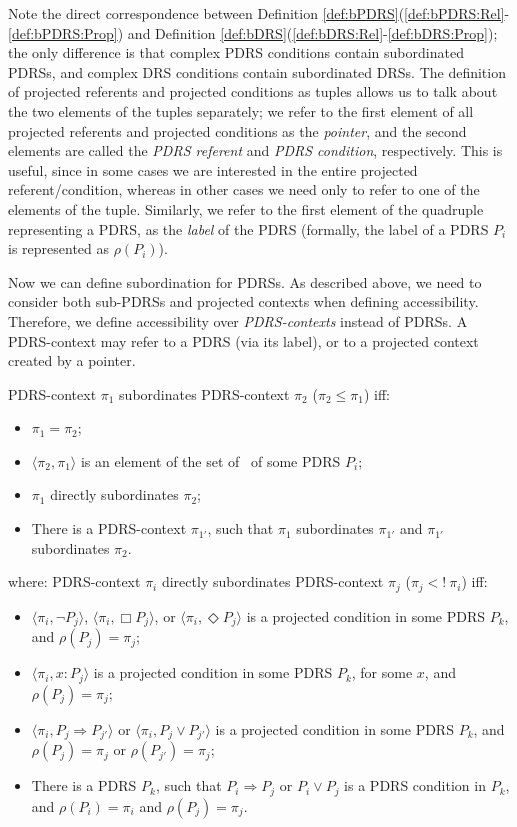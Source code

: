 \noindent Note the direct correspondence between Definition
\ref{def:bPDRS}(\ref{def:bPDRS:Rel}-\ref{def:bPDRS:Prop}) and Definition
\ref{def:bDRS}(\ref{def:bDRS:Rel}-\ref{def:bDRS:Prop}); the only difference
is that complex PDRS conditions contain subordinated PDRSs, and complex DRS
conditions contain subordinated DRSs.  The definition of projected referents
and projected conditions as tuples allows us to talk about the two elements
of the tuples separately; we refer to the first element of all projected
referents and projected conditions as the \textit{pointer}, and the second
elements are called the \textit{PDRS referent} and \textit{PDRS condition},
respectively. This is useful, since in some cases we are interested in the
entire projected referent/condition, whereas in other cases we need only to
refer to one of the elements of the tuple. Similarly, we refer to the first
element of the quadruple representing a PDRS, as the \textit{label} of the
PDRS (formally, the label of a PDRS $P_i$ is represented as $\rho(P_i)$).

Now we can define subordination for PDRSs. As described above, we need to
consider both sub-PDRSs and projected contexts when defining accessibility.
Therefore, we define accessibility over \textit{PDRS-contexts} instead of
PDRSs. A PDRS-context may refer to a PDRS (via its label), or to
a projected context created by a pointer.

\begin{definition}
PDRS-context $\pi_1$ subordinates PDRS-context $\pi_2$ ($\pi_2 \leq \pi_1$)
iff:
\begin{itemize}
  \item $\pi_1 = \pi_2$;
  \item $\langle \pi_2,\pi_1\rangle$ is an element of the set of \MAPs~of some PDRS $P_i$;
  \item $\pi_1$ directly subordinates $\pi_2$;
  \item There is a PDRS-context $\pi_{1'}$, such that $\pi_1$ subordinates
    $\pi_{1'}$ and $\pi_{1'}$ subordinates $\pi_2$.
\end{itemize}
where: PDRS-context $\pi_i$ directly subordinates PDRS-context $\pi_j$ 
($\pi_j <!~\pi_i$) iff:
\begin{itemize}
  \item $\langle\pi_i,\neg P_j\rangle$,
    $\langle\pi_i,\Box P_j\rangle$,
    or $\langle\pi_i,\Diamond P_j\rangle$ is a projected condition in
    some PDRS $P_k$, and $\rho(P_j) = \pi_j$;
  \item $\langle\pi_i,x:P_j\rangle$ is a projected condition in some
    PDRS $P_k$, for some $x$, and $\rho(P_j) = \pi_j$;
  \item  $\langle\pi_i,P_j \Rightarrow P_{j'}\rangle$ or
    $\langle\pi_i,P_j \vee P_{j'}\rangle$ is a projected condition in
    some PDRS $P_k$, and $\rho(P_j) = \pi_j$ or $\rho(P_{j'}) = \pi_j$;
  \item There is a PDRS $P_k$, such that $P_i \Rightarrow P_j$ or 
    $P_i \vee P_j$ is a PDRS condition in $P_k$, and $\rho(P_i) = \pi_i$ 
    and $\rho(P_j) = \pi_j$. 
\end{itemize}
\end{definition}

